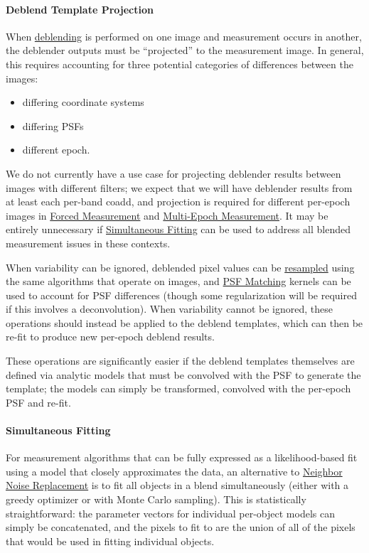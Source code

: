 \paragraph{Deblend Template Projection}
\label{sec:acDeblendTemplateProjection}

When \hyperref[sec:acDeblending]{deblending} is performed on one image and measurement occurs in another, the deblender outputs must be ``projected'' to the measurement image.  In general, this requires accounting for three potential categories of differences between the images:
\begin{itemize}
\item differing coordinate systems
\item differing PSFs
\item different epoch.
\end{itemize}
We do not currently have a use case for projecting deblender results between images with different filters; we expect that we will have deblender results from at least each per-band coadd, and projection is required for different per-epoch images in \hyperref[sec:acForcedMeasurement]{Forced Measurement} and \hyperref[sec:acMultiEpochMeasurement]{Multi-Epoch Measurement}.  It may be entirely unnecessary if \hyperref[sec:acSimultaneousFitting]{Simultaneous Fitting} can be used to address all blended measurement issues in these contexts.

When variability can be ignored, deblended pixel values can be \hyperref[sec:spWarp]{resampled} using the same algorithms that operate on images, and \hyperref[sec:acPsfMatching]{PSF Matching} kernels can be used to account for PSF differences (though some regularization will be required if this involves a deconvolution).  When variability cannot be ignored, these operations should instead be applied to the deblend templates, which can then be re-fit to produce new per-epoch deblend results.

These operations are significantly easier if the deblend templates themselves are defined via analytic models that must be convolved with the PSF to generate the template; the models can simply be transformed, convolved with the per-epoch PSF and re-fit.

\paragraph{Simultaneous Fitting}
\label{sec:acSimultaneousFitting}

For measurement algorithms that can be fully expressed as a likelihood-based fit using a model that closely approximates the data, an alternative to \hyperref[sec:acReplaceNeighborsWithNoise]{Neighbor Noise Replacement} is to fit all objects in a blend simultaneously (either with a greedy optimizer or with Monte Carlo sampling).  This is statistically straightforward: the parameter vectors for individual per-object models can simply be concatenated, and the pixels to fit to are the union of all of the pixels that would be used in fitting individual objects.

